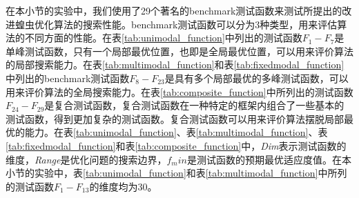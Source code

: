 在本小节的实验中，我们使用了29个著名的benchmark测试函数来测试所提出的改进蝗虫优化算法的搜索性能。benchmark测试函数可以分为3种类型，用来评估算法的不同方面的性能。在表\ref{tab:unimodal_function}中列出的测试函数$F_1-F_7$是单峰测试函数，只有一个局部最优位置，也即是全局最优位置，可以用来评价算法的局部搜索能力。在表\ref{tab:multimodal_function}和表\ref{tab:fixedmodal_function}中列出的benchmark测试函数$F_8-F_{23}$是具有多个局部最优的多峰测试函数，可以用来评价算法的全局搜索能力\cite{saremi2017grasshopper}。在表\ref{tab:composite_function}中所列出的测试函数$F_{24}-F_{29}$是复合测试函数\cite{liang2005novel}，复合测试函数在一种特定的框架内组合了一些基本的测试函数，得到更加复杂的测试函数。复合测试函数可以用来评价算法摆脱局部最优的能力。在表\ref{tab:unimodal_function}、表\ref{tab:multimodal_function}、表\ref{tab:fixedmodal_function}和表\ref{tab:composite_function}中，\emph{Dim}表示测试函数的维度，\emph{Range}是优化问题的搜索边界，$f_min$是测试函数的预期最优适应度值。在本小节的实验中，表\ref{tab:unimodal_function}和表\ref{tab:multimodal_function}中所列的测试函数$F_1-F_{13}$的维度均为30。

